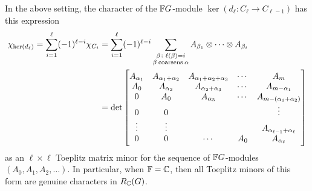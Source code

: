 \begin{cor}
\label{corollary-of-P-P-exact-sequence}
In the above setting, the character of the $\mathbb{F} G$-module
$\ker(d_\ell: C_\ell \rightarrow C_{\ell-1})$
has this expression
\begin{align*}
\chi_{\ker(d_\ell)}
=\sum_{i=1}^\ell (-1)^{\ell-i} \chi_{C_i}
&=\sum_{i=1}^\ell (-1)^{\ell-i}
 \sum_{\substack{\beta \colon \ell(\beta)=i \\ \beta \: {\rm      coarsens   } \: \alpha}} 
  A_{\beta_1} \otimes \cdots \otimes A_{\beta_i}\\ 
&=\det\left[
\begin{matrix}
A_{\alpha_1} & A_{\alpha_1+\alpha_2}  & A_{\alpha_1+\alpha_2+\alpha_3}  & \cdots &A_m  \\
A_0 & A_{\alpha_2} & A_{\alpha_2+\alpha_3}  &\cdots  &A_{m-\alpha_1}    \\
0 & A_0 & A_{\alpha_3} & \cdots & A_{m-(\alpha_1+\alpha_2)}   \\
0 & 0 &   &   & \vdots\\
\vdots & \vdots &  &  & A_{\alpha_{\ell-1}+\alpha_\ell}\\
0 & 0   &   \cdots     & A_0 &A_{\alpha_\ell}
\end{matrix}
\right]
\end{align*}
as an $\ell \times \ell$ Toeplitz matrix minor for the sequence of $\mathbb{F} G$-modules $(A_0,A_1,A_2,\ldots)$.  In particular, when $\mathbb{F}=\mathbb{C}$,
then all Toeplitz minors
of this form are genuine characters in $R_{\mathbb{C}}(G)$.
\end{cor}


